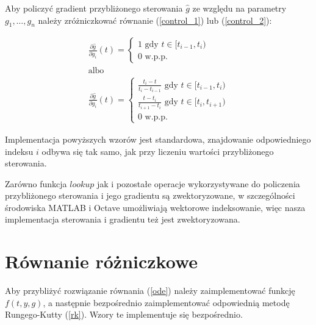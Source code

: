 \documentclass[licencjacka]{pracamgr}
\begin{document}
Aby policzyć gradient przybliżonego sterowania $\hat{g}$ ze względu na parametry $g_1,\ldots,g_n$ należy zróżniczkować równanie (\ref{control_1}) lub (\ref{control_2}):

\begin{gather}
  \frac{\partial \hat{g}}{\partial g_i}(t) = \begin{cases} 1 \text{ gdy } t \in [t_{i-1}, t_i) \\ 0 \text{ w.p.p.} \end{cases} \label{dcontrol_1}\\
  \nonumber \text{albo}\\
  \frac{\partial \hat{g}}{\partial g_i}(t) = \begin{cases} \frac{t_i - t}{t_i - t_{i-1}} \text{ gdy } t \in [t_{i-1}, t_i) \\ \frac{t - t_i}{t_{i+1} - t_i} \text{ gdy } t \in [t_{i}, t_{i+1}) \\ 0 \text{ w.p.p.} \end{cases} \label{dcontrol_2}
\end{gather}

Implementacja powyższych wzorów jest standardowa, znajdowanie odpowiedniego indeksu $i$ odbywa się tak samo, jak przy liczeniu wartości przybliżonego sterowania.

Zarówno funkcja $lookup$ jak i pozostałe operacje wykorzystywane do policzenia przybliżonego sterowania i jego gradientu są zwektoryzowane, w szczególności środowiska MATLAB i Octave umożliwiają wektorowe indeksowanie, więc nasza implementacja sterowania i gradientu też jest zwektoryzowana.

\section{Równanie różniczkowe}\label{subsec_rrz}
Aby przybliżyć rozwiązanie równania (\ref{ode}) należy zaimplementować funkcję $f(t,y,g)$, a następnie bezpośrednio zaimplementować odpowiednią metodę Rungego-Kutty (\ref{rk}). Wzory te implementuje się bezpośrednio.
\end{document}
